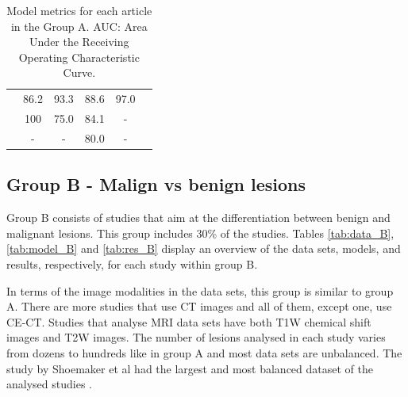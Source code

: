 \documentclass[11pt]{article}
\begin{document}
\begin{table}[]
\begin{tabular}{cccccc}
        \cite{Schieda2017}                  & 86.2                                       & 93.3                                       & 88.6                                    & 97.0                               \\
        \cite{Tu2020}                       & 100                                        & 75.0                                       & 84.1                                    & -                                  \\
        \cite{Romeo2018}                    & -                                          & -                                          & 80.0                                    & -                                  \\
        \bottomrule
    \end{tabular}
    \caption{Model metrics for each article in the Group A. AUC: Area Under the Receiving Operating Characteristic Curve.}
    \label{tab:res_A}
\end{table}

\subsection{Group B - Malign vs benign lesions}

Group B consists of studies that aim at the differentiation between benign and
malignant lesions. This group includes 30\% of the studies. Tables
\ref{tab:data_B}, \ref{tab:model_B} and \ref{tab:res_B} display an overview of
the data sets, models, and results, respectively, for each study within group B.

In terms of the image modalities in the data sets, this group is similar to
group A. There are more studies that use CT images and all of them, except one,
use CE-CT. Studies that analyse MRI data sets have both T1W chemical shift
images and T2W images. The number of lesions analysed in each study varies from
dozens to hundreds like in group A and most data sets are unbalanced. The study
by Shoemaker et al had the largest and most balanced dataset of the analysed
studies \cite{Shoemaker2018}.
\end{document}
